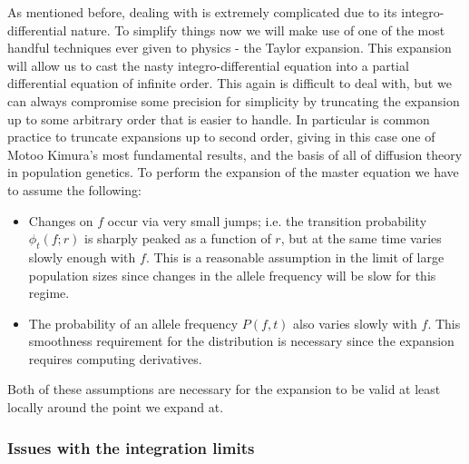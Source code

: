 As mentioned before, dealing with  is extremely
complicated due to its integro-differential nature. To simplify things now we
will make use of one of the most handful techniques ever given to physics - the
Taylor expansion. This expansion will allow us to cast the nasty
integro-differential equation into a partial differential equation of infinite
order. This again is difficult to deal with, but we can always compromise some
precision for simplicity by truncating the expansion up to some arbitrary order
that is easier to handle. In particular is common practice to truncate
expansions up to second order, giving in this case one of Motoo Kimura's most
fundamental results, and the basis of all of diffusion theory in population
genetics. To perform the expansion of the master equation we have to assume the
following:
\begin{itemize}
  \item Changes on $f$ occur via very small jumps; i.e. the transition
  probability $\phi_t(f; r)$ is sharply peaked as a function of $r$, but at the
  same time varies slowly enough with $f$. This is a reasonable assumption in
  the limit of large population sizes since changes in the allele frequency
  will be slow for this regime.
  \item The probability of an allele frequency $P(f, t)$ also varies slowly
  with $f$. This smoothness requirement for the distribution is necessary since
  the expansion requires computing derivatives.
\end{itemize}
Both of these assumptions are necessary for the expansion to be valid at least
locally around the point we expand at.

\subsubsection{Issues with the integration limits}

